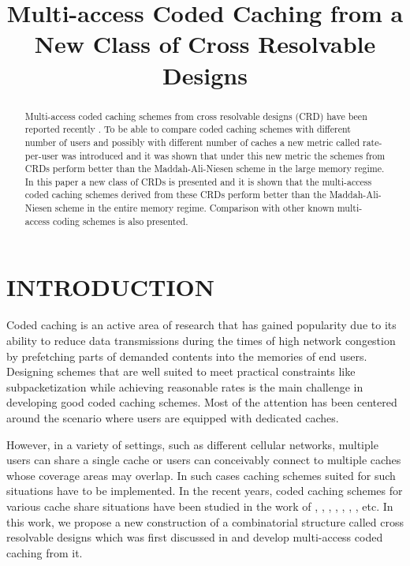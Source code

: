 \documentclass[conference]{IEEEtran}
\begin{document}
	\title{Multi-access Coded Caching from a New Class of Cross Resolvable Designs} 
	
	\author{%
	}
	\maketitle
	\thispagestyle{plain}
	\pagestyle{plain}
	\begin{abstract}
    Multi-access coded caching schemes from cross resolvable designs (CRD) have been reported recently \cite{KNRarXiv}. To be able to compare coded caching schemes with different number of users and possibly with different number of caches a new metric called  rate-per-user  was introduced and it was shown that under this new metric the schemes from CRDs perform better than the Maddah-Ali-Niesen scheme in the large memory regime.   In this paper a new class of CRDs is presented and it is shown that the multi-access coded caching schemes derived from these CRDs perform better than the Maddah-Ali-Niesen scheme in the entire memory regime.  Comparison with other known multi-access coding schemes is also presented. 
	\end{abstract}
	\section{INTRODUCTION}
    Coded caching is an active area of research that has gained popularity due to its ability to reduce data transmissions during the times of high network congestion by prefetching parts of demanded contents into the memories of end users.
    Designing schemes that are well suited to meet practical constraints like subpacketization while achieving reasonable rates is the main challenge in developing good coded caching schemes.
    Most of the attention has been centered around the scenario where users are equipped with dedicated caches.
      
    However, in a variety of settings, such as different cellular networks, multiple users can share a single cache or users can conceivably connect to multiple caches whose coverage areas may overlap. In such cases caching schemes suited for such situations have to be implemented. In the recent years, coded caching schemes for various cache share situations have been studied in the work of \cite{SBP2}, \cite{AAA}, \cite{HKD}, \cite{SPE}, \cite{RaK3}, \cite{KNRarXiv}, \cite{CLWZC}, \cite{BL} etc. In this work, we propose a new construction of a combinatorial structure called cross resolvable designs which was first discussed in \cite{KNRarXiv} and develop multi-access coded caching from it.
\end{document}
